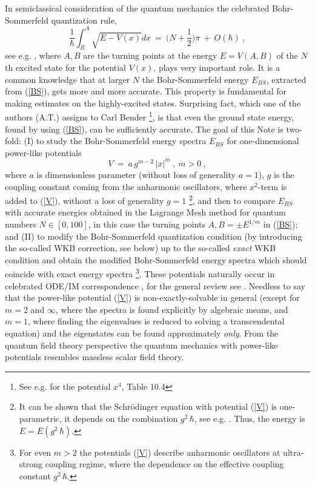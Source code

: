 \documentclass[preprint,preprintnumbers,amsmath,amssymb]{revtex4}
\newcommand{\half}{\frac{1}{2}}
\begin{document}
In semiclassical consideration of the quantum mechanics the celebrated Bohr-Sommerfeld quantization rule,
\begin{equation}
\label{BS}
  \frac{1}{\hbar} \int_{B}^{A} \sqrt{E - V(x)} d x\ =\ \bigg(N + \half\bigg) \pi\ +\ O(\hbar) \ ,
\end{equation}
see e.g. \cite{LL}, where $A,B$ are the turning points at the energy $E=V(A,B)$ of the $N$th excited state for the potential $V(x)$, plays very important role. It is a common knowledge that at larger $N$ the Bohr-Sommerfeld energy $E_{BS}$, extracted from (\ref{BS}), gets more and more accurate. This property is fundamental for making estimates on the highly-excited states. Surprising fact, which one of the authors (A.T.) assigns to Carl Bender \cite{Bender:1990} \footnote{See e.g. \cite{Bender-Orszag:1978} for the potential $x^4$, Table 10.4}, is that even the ground state energy, found by using (\ref{BS}), can be sufficiently accurate. The goal of this Note is two-fold: (I) to study the Bohr-Sommerfeld energy spectra $E_{BS}$ for one-dimensional power-like potentials
\begin{equation}
\label{V}
  V \ =\ a\, g^{m-2}\,|x|^m \ ,\ m>0\ ,
\end{equation}
where $a$ is dimensionless parameter (without loss of generality $a=1$), $g$ is the coupling constant coming from the anharmonic oscillators, where $x^2$-term is added to (\ref{V}), without a loss of generality $g=1$ \footnote{It can be shown that the Schr\"odinger equation with potential (\ref{V}) is one-parametric, it depends on the combination $g^2\,\hbar$, see e.g.  \cite{ST:2021}. Thus, the energy is $E=E(g^2\,\hbar)$.}, and then to compare $E_{BS}$ with accurate energies obtained in the Lagrange Mesh method \cite{Baye:2015,Tur-delValle:2021} for quantum numbers $N \in [0, 100]$, in this case the turning points $A,B=\pm E^{1/m}$ in (\ref{BS}); and (II) to modify the Bohr-Sommerfeld quantization condition (by introducing the so-called WKB correction, see below) up to the so-called {\it exact} WKB condition and obtain the modified Bohr-Sommerfeld energy spectra which should coincide with exact energy spectra
\footnote{For even $m > 2$ the potentials (\ref{V}) describe anharmonic oscillators at ultra-strong coupling regime, where the dependence on the effective coupling constant $g^2\,\hbar$.}.
These potentials naturally occur in celebrated ODE/IM correspondence \cite{Dorey-Tateo:1999}, for the general review see \cite{Dorey:2020}. Needless to say that the power-like potential (\ref{V}) is non-exactly-solvable in general (except for $m=2$ and $\infty$, where the spectra is found explicitly by algebraic means, and $m=1$, where finding the eigenvalues is reduced to solving a transcendental equation) and the eigenstates can be found approximately {\it only}. From the quantum field theory perspective the quantum mechanics with power-like potentials resembles massless scalar field theory.
\end{document}
